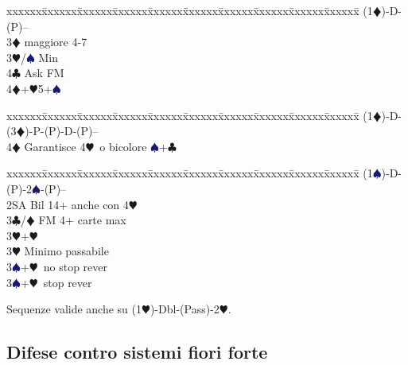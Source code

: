 \documentclass[a4paper,italian]{article}
\newcommand{\BC}{\textcolor{OliveGreen}{$\clubsuit$}}
\newcommand{\BD}{\textcolor{RedOrange}{$\vardiamondsuit$}}
\newcommand{\BH}{\textcolor{Red2}{$\varheartsuit${}}}
\newcommand{\BS}{\textcolor{MidnightBlue}{$\spadesuit${}}}
\newenvironment{bidtable}
{\begin{tabbing}

    xxxxxx\=xxxxxx\=xxxxxx\=xxxxxx\=xxxxxx\=xxxxxx\=xxxxxx\=xxxxxx\=xxxxxx\=xxxxxx\=\kill}
{\end{tabbing} }%
\begin{document}
\begin{multicols}{2}
                                        \begin{bidtable}
                                            (1\BD)-D-(P)--\+\\
                                            3\BD {} maggiore 4-7\+\\
                                            3\BH/\BS \> Min\\
                                            4\BC \> Ask FM\-\\
                                            4\BD {}+\BH 5+\BS \-
                                        \end{bidtable}
                                        \begin{bidtable}
                                            (1\BD)-D-(3\BD)-P-(P)-D-(P)--\+\\
                                            4\BD \> Garantisce 4\BH\ o bicolore \BS +\BC \-
                                        \end{bidtable}
                                        \columnbreak
                                        \begin{bidtable}
                                            (1\BS)-D-(P)-2\BS-(P)--\+\\
                                            2SA \> Bil 14+ anche con 4\BH \\
                                            3\BC/\BD \> FM 4+ carte max\+\\
                                            3\BH {}+\BH \-\\
                                            3\BH \> Minimo passabile\\
                                            3\BS {}+\BH\ no stop rever\\
                                            3\BS {}+\BH\ stop rever\-
                                        \end{bidtable}

                                        Sequenze valide anche su (1\BH )-Dbl-(Pass)-2\BH .

                                        \subsection{Difese contro sistemi fiori forte}


\end{multicols}
\end{document}
